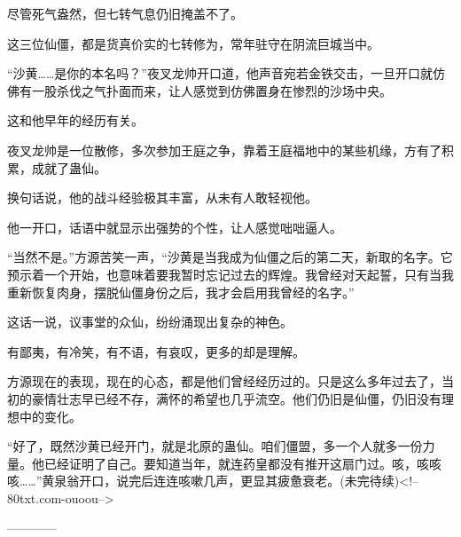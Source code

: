 \begin{this_body}
尽管死气盎然，但七转气息仍旧掩盖不了。

这三位仙僵，都是货真价实的七转修为，常年驻守在阴流巨城当中。

“沙黄……是你的本名吗？”夜叉龙帅开口道，他声音宛若金铁交击，一旦开口就仿佛有一股杀伐之气扑面而来，让人感觉到仿佛置身在惨烈的沙场中央。

这和他早年的经历有关。

夜叉龙帅是一位散修，多次参加王庭之争，靠着王庭福地中的某些机缘，方有了积累，成就了蛊仙。

换句话说，他的战斗经验极其丰富，从未有人敢轻视他。

他一开口，话语中就显示出强势的个性，让人感觉咄咄逼人。

“当然不是。”方源苦笑一声，“沙黄是当我成为仙僵之后的第二天，新取的名字。它预示着一个开始，也意味着要我暂时忘记过去的辉煌。我曾经对天起誓，只有当我重新恢复肉身，摆脱仙僵身份之后，我才会启用我曾经的名字。”

这话一说，议事堂的众仙，纷纷涌现出复杂的神色。

有鄙夷，有冷笑，有不语，有哀叹，更多的却是理解。

方源现在的表现，现在的心态，都是他们曾经经历过的。只是这么多年过去了，当初的豪情壮志早已经不存，满怀的希望也几乎流空。他们仍旧是仙僵，仍旧没有理想中的变化。

“好了，既然沙黄已经开门，就是北原的蛊仙。咱们僵盟，多一个人就多一份力量。他已经证明了自己。要知道当年，就连药皇都没有推开这扇门过。咳，咳咳咳……”黄泉翁开口，说完后连连咳嗽几声，更显其疲惫衰老。(未完待续)<!--80txt.com-ouoou-->

------------

\end{this_body}

